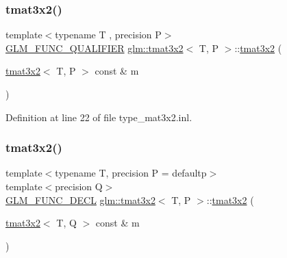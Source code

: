 \subsubsection{\texorpdfstring{tmat3x2()}{tmat3x2()}\hspace{0.1cm}{\footnotesize\ttfamily [2/22]}}
{\footnotesize\ttfamily template$<$typename T , precision P$>$ \\
\mbox{\hyperlink{setup_8hpp_a33fdea6f91c5f834105f7415e2a64407}{G\+L\+M\+\_\+\+F\+U\+N\+C\+\_\+\+Q\+U\+A\+L\+I\+F\+I\+ER}} \mbox{\hyperlink{structglm_1_1tmat3x2}{glm\+::tmat3x2}}$<$ T, P $>$\+::\mbox{\hyperlink{structglm_1_1tmat3x2}{tmat3x2}} (\begin{DoxyParamCaption}\item[{\mbox{\hyperlink{structglm_1_1tmat3x2}{tmat3x2}}$<$ T, P $>$ const \&}]{m }\end{DoxyParamCaption})}



Definition at line 22 of file type\+\_\+mat3x2.\+inl.

\mbox{\label{structglm_1_1tmat3x2_a238eaf8178ff26a8c6adb554790043ee}} 
\subsubsection{\texorpdfstring{tmat3x2()}{tmat3x2()}\hspace{0.1cm}{\footnotesize\ttfamily [3/22]}}
{\footnotesize\ttfamily template$<$typename T, precision P = defaultp$>$ \\
template$<$precision Q$>$ \\
\mbox{\hyperlink{setup_8hpp_ab2d052de21a70539923e9bcbf6e83a51}{G\+L\+M\+\_\+\+F\+U\+N\+C\+\_\+\+D\+E\+CL}} \mbox{\hyperlink{structglm_1_1tmat3x2}{glm\+::tmat3x2}}$<$ T, P $>$\+::\mbox{\hyperlink{structglm_1_1tmat3x2}{tmat3x2}} (\begin{DoxyParamCaption}\item[{\mbox{\hyperlink{structglm_1_1tmat3x2}{tmat3x2}}$<$ T, Q $>$ const \&}]{m }\end{DoxyParamCaption})}

\mbox{\label{structglm_1_1tmat3x2_a55c97bff59125b697080912cfa030b0e}} 
